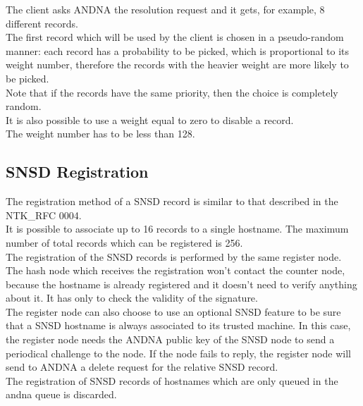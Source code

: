 \documentclass[a4paper]{article}
\begin{document}
The client asks ANDNA the resolution request and it gets, for example, 8
different records.\\
The first record which will be used by the client is chosen in a pseudo-random
manner: each record has a probability to be picked, which is proportional to its
weight number, therefore the records with the heavier weight are more likely to
be picked.\\
Note that if the records have the same priority, then the choice is completely
random.\\

It is also possible to use a weight equal to zero to disable a record.\\

The weight number has to be less than 128.\\

\subsection{SNSD Registration}

The registration method of a SNSD record is similar to that described in the
NTK\_RFC 0004.\\

It is possible to associate up to 16 records to a single hostname.
The maximum number of total records which can be registered is 256.\\

The registration of the SNSD records is performed by the same register node.
The hash node which receives the registration won't contact the counter node,
because the hostname is already registered and it doesn't need to verify
anything about it. It has only to check the validity of the signature.\\

The register node can also choose to use an optional SNSD feature to be sure
that a SNSD hostname is always associated to its trusted machine. In this
case, the register node needs the ANDNA public key of the SNSD node to send a
periodical challenge to the node.
If the node fails to reply, the register node will send to ANDNA a delete
request for the relative SNSD record.\\

The registration of SNSD records of hostnames which are only queued in the
andna queue is discarded.
\end{document}
